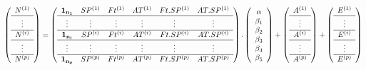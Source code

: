 \documentclass[11pt,fleqn]{book} %
\begin{document}
	\begin{equation}
		\left (\begin{array}{c}
			N^{(1)} \\
			\hline
			\vdots \\
			\hline
			N^{(i)} \\
			\hline
			\vdots \\
			\hline
			N^{(p)} \\
		\end{array}\right) =
		\left (\begin{array}{c c c c c c}
			\mathbf{1_{n_1}} & SP^{(1)} & Ft^{(1)} & AT^{(1)} & Ft.SP^{(1)} & AT.SP^{(1)} \\
			\hline
			\vdots & \vdots & \vdots & \vdots & \vdots & \vdots  \\
			\hline
			\mathbf{1_{n_i}} & SP^{(i)} & Ft^{(i)} & AT^{(i)} & Ft.SP^{(i)} & AT.SP^{(i)} \\
			\hline
			\vdots & \vdots & \vdots & \vdots & \vdots & \vdots  \\
			\hline
			\mathbf{1_{n_p}} & SP^{(p)} & Ft^{(p)} & AT^{(p)} & Ft.SP^{(p)} & AT.SP^{(p)}\\
		\end{array}\right) .
		\left (\begin{array}{c}
			\alpha\\
			\beta_1 \\
			\beta_2 \\
			\beta_3 \\
			\beta_4 \\
			\beta_5 \\
		\end{array}\right) +
		\left (\begin{array}{c}
			A^{(1)}\\
			\hline
			\vdots \\
			\hline
			A^{(i)}\\
			\hline
			\vdots \\
			\hline
			A^{(p)}\\
			
		\end{array}\right) +
		\left (\begin{array}{c}
			E^{(1)}\\
			\hline
			\vdots \\
			\hline
			E^{(i)}\\
			\hline
			\vdots \\
			\hline
			E^{(p)}\\
		\end{array}\right)
	\end{equation}
	
\end{document}
